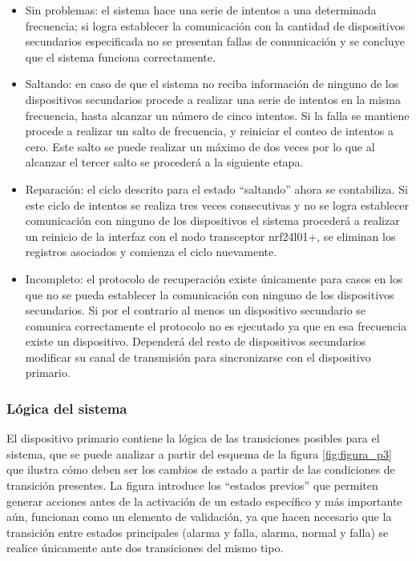 \begin{itemize}
\item Sin problemas: el sistema hace una serie de intentos a una determinada frecuencia; si logra establecer la comunicación con la cantidad de dispositivos secundarios especificada no se presentan fallas de comunicación y se concluye que el sistema funciona correctamente.
\item Saltando: en caso de que el sistema no reciba información de ninguno de los dispositivos secundarios procede a realizar una serie de intentos en la misma frecuencia, hasta alcanzar un número de cinco intentos. Si la falla se mantiene procede a realizar un salto de frecuencia, y reiniciar el conteo de intentos a cero. Este salto se puede realizar un máximo de dos veces por lo que al alcanzar el tercer salto se procederá a la siguiente etapa. 
\item Reparación: el ciclo descrito para el estado ``saltando'' ahora se contabiliza. Si este ciclo de intentos se realiza tres veces consecutivas y no se logra establecer comunicación con ninguno de los dispositivos el sistema procederá a realizar un reinicio de la interfaz con el nodo transceptor nrf24l01+, se eliminan los registros asociados y comienza el ciclo nuevamente.
\item Incompleto: el protocolo de recuperación existe únicamente para casos en los que no se pueda establecer la comunicación con ninguno de los dispositivos secundarios. Si por el contrario al menos un dispositivo secundario se comunica correctamente el protocolo no es ejecutado ya que en esa frecuencia existe un dispositivo. Dependerá del resto de dispositivos secundarios modificar su canal de transmisión para sincronizarse con el dispositivo primario.  
\end{itemize}

\subsubsection{Lógica del sistema}

El dispositivo primario contiene la lógica de las transiciones posibles para el sistema, que se puede analizar a partir del esquema de la figura \ref{fig:figura_p3} que ilustra cómo deben ser los cambios de estado a partir de las condiciones de transición presentes. La figura introduce los  ``estados previos'' que permiten generar acciones antes de la activación de un estado específico y más importante aún, funcionan como un elemento de validación, ya que hacen necesario que la transición entre estados principales (alarma y falla, alarma, normal y falla) se realice únicamente ante dos transiciones del mismo tipo.

